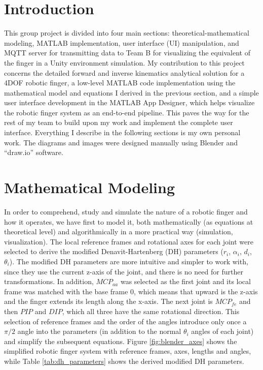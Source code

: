 \documentclass[a4paper,12pt]{article}
\begin{document}
\listoftables
\newpage

\listoffigures
\newpage

\section{Introduction}
This group project is divided into four main sections: theoretical-mathematical modeling, MATLAB implementation, user interface (UI) manipulation, and MQTT server for transmitting data to Team B for visualizing the equivalent of the finger in a Unity environment simulation. My contribution to this project concerns the detailed forward and inverse kinematics analytical solution for a 4DOF robotic finger, a low-level MATLAB code implementation using the mathematical model and equations I derived in the previous section, and a simple user interface development in the MATLAB App Designer, which helps visualize the robotic finger system as an end-to-end pipeline. This paves the way for the rest of my team to build upon my work and implement the complete user interface. Everything I describe in the following sections is my own personal work. The diagrams and images were designed manually using Blender and ``draw.io'' software.


\section{Mathematical Modeling}
In order to comprehend, study and simulate the nature of a robotic finger and how it operates, we have first to model it, both mathematically (as equations at theoretical level) and algorithmically in a more practical way (simulation, visualization). The local reference frames and rotational axes for each joint were selected to derive the modified Denavit-Hartenberg (DH) parameters ($r_{i}$, $\alpha_{i}$, $d_i$, $\theta_i$). The modified DH parameters are more intuitive and simpler to work with, since they use the current z-axis of the joint, and there is no need for further transformations. In addition, $MCP_{aa}$ was selected as the first joint and its local frame was matched with the base frame 0, which means that upward is the z-axis and the finger extends its length along the x-axis. The next joint is $MCP_{fe}$ and then $PIP$ and $DIP$, which all three have the same rotational direction. This selection of reference frames and the order of the angles introduce only once a $\pi/2$ angle into the parameters (in addition to the normal $\theta_{i}$ angles of each joint) and simplify the subsequent equations. Figure \ref{fig:blender_axes} shows the simplified robotic finger system with reference frames, axes, lengths and angles, while Table \ref{tab:dh_parameters} shows the derived modified DH parameters.
\end{document}

